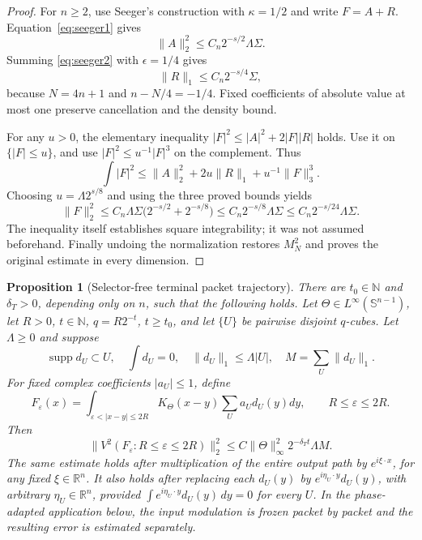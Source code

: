 \documentclass[11pt]{article}
\numberwithin{equation}{section}
\newtheorem{proposition}[theorem]{Proposition}
\theoremstyle{remark}
\theoremstyle{definition}
\newcommand{\R}{\mathbb R}
\newcommand{\Sph}{\mathbb S}
\newcommand{\supp}{\operatorname{supp}}
\newcommand{\norm}[1]{\lVert #1\rVert}
\begin{document}
\begin{proof}
For $n\ge2$, use Seeger's construction with $\kappa=1/2$ and
write $F=A+R$. Equation~\eqref{eq:seeger1} gives
\begin{equation}\label{eq:full-A}
 \norm A_2^2\le C_n2^{-s/2}\Lambda\Sigma.
\end{equation}
Summing \eqref{eq:seeger2} with $\epsilon=1/4$ gives
\begin{equation}\label{eq:full-R}
 \norm R_1\le C_n2^{-s/4}\Sigma,
\end{equation}
because $N=4n+1$ and $n-N/4=-1/4$. Fixed coefficients of absolute
value at most one preserve cancellation and the density bound.

For any $u>0$, the elementary inequality
$|F|^2\le|A|^2+2|F||R|$ holds. Use it on $\{|F|\le u\}$,
and use $|F|^2\le u^{-1}|F|^3$ on the complement. Thus
\[
 \int|F|^2\le\norm A_2^2+2u\norm R_1+u^{-1}\norm F_3^3.
\]
Choosing $u=\Lambda2^{s/8}$ and using the three proved bounds yields
\[
 \norm F_2^2\le C_n\Lambda\Sigma
       \bigl(2^{-s/2}+2^{-s/8}\bigr)
 \le C_n2^{-s/8}\Lambda\Sigma
 \le C_n2^{-s/24}\Lambda\Sigma.
\]
The inequality itself establishes square integrability; it was not
assumed beforehand. Finally undoing the normalization restores
$M_N^2$ and proves the original estimate in every dimension.
\end{proof}

\begin{proposition}[Selector-free terminal packet trajectory]
\label{prop:terminalpacket}
There are $t_0\in\mathbb N$ and $\delta_T>0$, depending only on $n$, such
that the following holds.  Let $\Theta\in L^\infty(\Sph^{n-1})$, let
$R>0$, $t\in\mathbb N$, $q=R2^{-t}$, $t\ge t_0$, and let
$\{U\}$ be pairwise disjoint $q$-cubes.  Let $\Lambda\ge0$ and suppose
\[
 \supp d_U\subset U,
 \quad \int d_U=0,
 \quad \norm{d_U}_1\le\Lambda|U|,
 \quad M=\sum_U\norm{d_U}_1.
\]
For fixed complex coefficients $|a_U|\le1$, define
\[
 F_\varepsilon(x)=\int_{\varepsilon<|x-y|\le2R}
 K_\Theta(x-y)\sum_Ua_Ud_U(y)dy,
 \qquad R\le\varepsilon\le2R.
\]
Then
\begin{equation}\label{eq:terminalpacket}
 \norm{V^2(F_\varepsilon:R\le\varepsilon\le2R)}_2^2
 \le C\norm\Theta_\infty^2 2^{-\delta_Tt}\Lambda M.
\end{equation}
The same estimate holds after multiplication of the entire output path by
$e^{i\xi\cdot x}$, for any fixed $\xi\in\R^n$.  It also holds after
replacing each $d_U(y)$ by $e^{i\eta_U\cdot y}d_U(y)$, with arbitrary
$\eta_U\in\R^n$, provided
$\int e^{i\eta_U\cdot y}d_U(y)\,dy=0$ for every $U$.  In the
phase-adapted application below, the input modulation is frozen packet by
packet and the resulting error is estimated separately.
\end{proposition}
\end{document}
